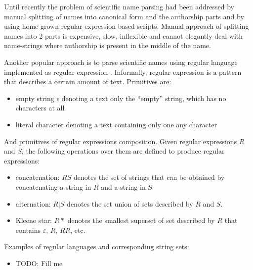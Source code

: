 \documentclass{bmcart}
\begin{document}
Until recently the problem of scientific name parsing had been addressed by
manual splitting of names into canonical form and the authorship parts and
by using home-grown regular expression-based scripts. Manual approach of
splitting names into 2 parts is expensive, slow, inflexible and cannot
elegantly deal with name-strings where authorship is present in the middle of
the name.

Another popular approach is to parse scientific names using regular language
implemented as regular expression \cite{aho1992foundations}. Informally, regular
expression is a pattern that describes a certain amount of text. Primitives are:

\begin{itemize}
  \item empty string $\epsilon$ denoting a text only the
  ``empty'' string, which has no characters at all
  \item literal character denoting a text containing only one any character
\end{itemize}

And primitives of regular expressions composition. Given regular expressions
$R$ and $S$, the following operations over them are defined to produce regular
expressions:

\begin{itemize}
  \item concatenation: $RS$ denotes the set of strings that can be obtained
  by concatenating a string in $R$ and a string in $S$
  \item alternation: $R \vert S$ denotes the set union of sets described by
  $R$ and $S$.
  \item Kleene star: $R*$ denotes the smallest superset of set described by
  $R$ that contains $\varepsilon$, $R$, $RR$, etc.
\end{itemize}

Examples of regular languages and corresponding string sets:

\begin{itemize}
    \item TODO: Fill me
\end{itemize}
\end{document}
